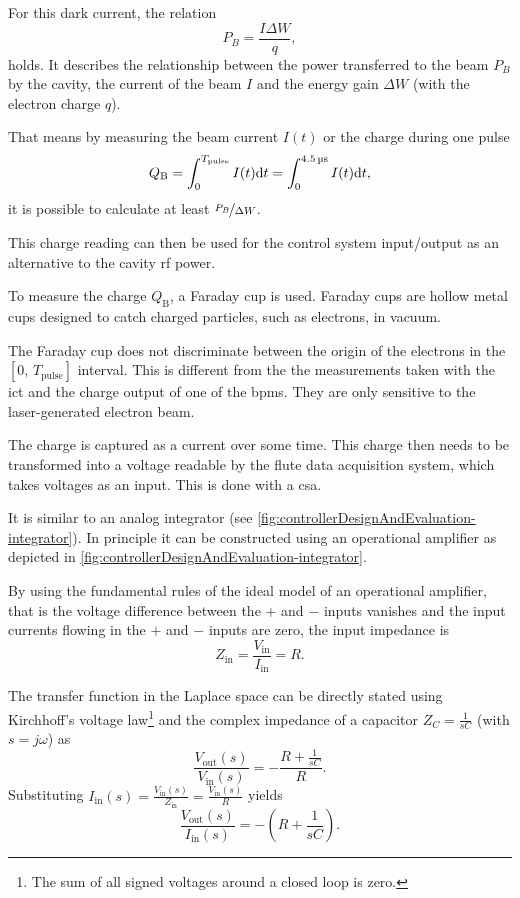 For this dark current, the relation
\begin{equation}
P_B = \frac{I \Delta W}{q},
\end{equation}
holds. It describes the relationship between the power transferred to the beam $P_B$ by the cavity, the current of the beam $I$ and the energy gain $\Delta W$ (with the electron charge $q$). \cite[p.~43]{Wangler2008}

That means by measuring the beam current $I(t)$ or the charge during one pulse
\begin{equation}
Q_\text{B} = \int_{0}^{T_\text{pulse}} I(t) \text{d}{t} = \int_{0}^{\SI{4.5}{\micro\second}} I(t) \text{d}{t},
\end{equation}
it is possible to calculate at least $\nicefrac{P_B}{\Delta W}$.

This charge reading can then be used for the control system input/output as an alternative to the cavity \gls{rf} power.

To measure the charge $Q_\text{B}$, a Faraday cup is used. Faraday cups are hollow metal cups designed to catch charged particles, such as electrons, in vacuum. \cite{radiabeamFaradayCups}

The Faraday cup does not discriminate between the origin of the electrons in the $[0,\,T_\text{pulse}]$ interval. This is different from the the measurements taken with the \gls{ict} and the charge output of one of the \glspl{bpm}. They are only sensitive to the laser-generated electron beam. \cite{Nasse2019}

The charge is captured as a current over some time. This charge then needs to be transformed into a voltage readable by the \gls{flute} data acquisition system, which takes voltages as an input. This is done with a \gls{csa}.

It is similar to an analog integrator (see \autoref{fig:controllerDesignAndEvaluation-integrator}). In principle it can be constructed using an operational amplifier as depicted in \autoref{fig:controllerDesignAndEvaluation-integrator}. \cite[p.~230]{Horowitz2015}

By using the fundamental rules of the ideal model of an operational amplifier, that is the voltage difference between the $+$ and $-$ inputs vanishes and the input currents flowing in the $+$ and $-$ inputs are zero, the input impedance is
\begin{equation}
Z_\text{in} = \frac{V_\text{in}}{I_\text{in}} = R.
\end{equation}

The transfer function in the Laplace space can be directly stated using Kirchhoff's voltage law\footnote{The sum of all signed voltages around a closed loop is zero.} and the complex impedance of a capacitor $Z_C=\frac{1}{sC}$ (with $s=j\omega$) as
\begin{equation}
\frac{V_\text{out}(s)}{V_\text{in}(s)} = -\frac{R+\frac{1}{sC}}{R}.
\end{equation}
Substituting $I_\text{in}(s)=\frac{V_\text{in}(s)}{Z_\text{in}} = \frac{V_\text{in}(s)}{R}$ yields
\begin{equation}
\frac{V_\text{out}(s)}{I_\text{in}(s)} = -\left(R+\frac{1}{sC}\right).
\end{equation}

